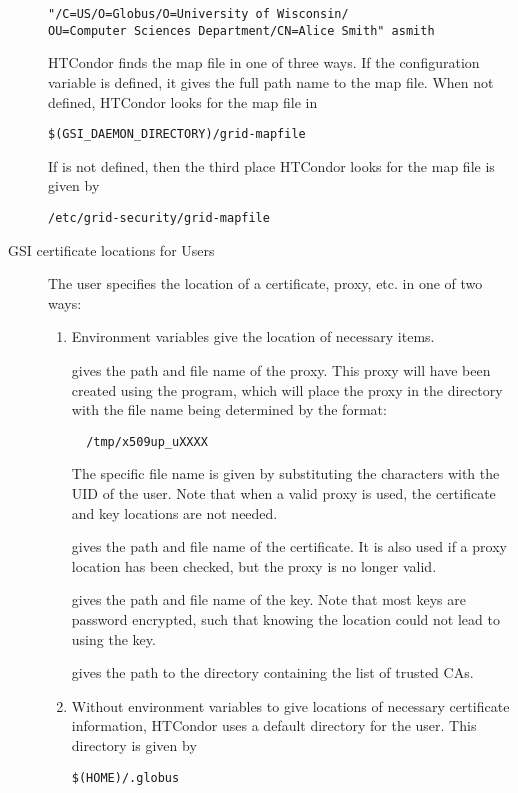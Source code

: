 \begin{description}
\footnotesize
\begin{verbatim}
"/C=US/O=Globus/O=University of Wisconsin/
OU=Computer Sciences Department/CN=Alice Smith" asmith
\end{verbatim}
\normalsize

HTCondor finds the map file in one of three ways.
If the configuration variable  is defined,
it gives the full path name to the map file.
When not defined,
HTCondor looks for the map file in 
\begin{verbatim}
$(GSI_DAEMON_DIRECTORY)/grid-mapfile
\end{verbatim}
If  is not defined,
then the third place HTCondor looks for the map file is given by
\begin{verbatim}
/etc/grid-security/grid-mapfile
\end{verbatim}


\item[GSI certificate locations for Users]

The user specifies the location of a certificate, proxy, etc.
in one of two ways:
\begin{enumerate}
\item
Environment variables give the location of necessary items.

   gives the path and file name of the proxy.
  This proxy will have been created using the  program, 
  which will place the proxy in the 
  directory with the file name being determined by the format:
  \begin{verbatim}
  /tmp/x509up_uXXXX
  \end{verbatim}
  The specific file name is given by substituting the \verb@XXXX@
  characters with the UID of the user.
  Note that when a valid proxy is used, the certificate and key locations
  are not needed. 

   gives the path and file name of the
  certificate. It is also used if a proxy location has been checked,
  but the proxy is no longer valid.  

   gives the path and file name of the
  key. Note that most keys are password encrypted, such that knowing
  the location could not lead to using the key. 

   gives the path to the directory 
  containing the list of trusted CAs. 

\item
Without environment variables to give locations of necessary
certificate information,
HTCondor uses a default directory for the user.
This directory is given by 
\begin{verbatim}
$(HOME)/.globus
\end{verbatim}
\end{enumerate}


\end{description}
